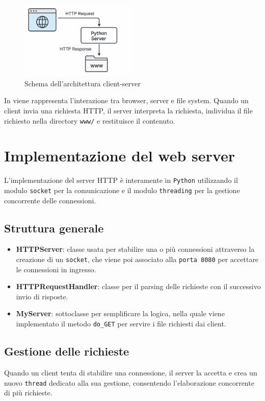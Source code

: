 \documentclass[a4paper,12pt]{report}
\begin{document}
\begin{figure}[H]
	\centering
	\includegraphics[width=0.5\textwidth]{img/architettura.png}
	\caption{Schema dell'architettura client-server}
	\label{fig:architettura}
\end{figure}

In  viene rappresenta l'interazione tra browser, server e file system. Quando un client
invia una richiesta HTTP, il server interpreta la richiesta, individua il file richiesto nella directory \texttt{www/}
e restituisce il contenuto.


\chapter{Implementazione del web server}
L'implementazione del server HTTP è interamente in \texttt{Python} utilizzando il modulo \texttt{socket} per
la comunicazione e il modulo \texttt{threading} per la gestione concorrente delle connessioni.

\section{Struttura generale}
\begin{itemize}
	\item \textbf{HTTPServer}: classe usata per stabilire una o più connessioni \newline attraverso la creazione di
	      un \texttt{socket}, che viene poi associato alla \texttt{porta 8080} per accettare le connessioni in ingresso.
	\item \textbf{HTTPRequestHandler}: classe per il parsing delle richieste con il successivo invio di risposte.
	\item \textbf{MyServer}: sottoclasse per semplificare la logica, nella quale viene implementato il
	      metodo \texttt{do\_GET} per servire i file richiesti dai client.
\end{itemize}


\section{Gestione delle richieste}
Quando un client tenta di stabilire una connessione, il server la accetta e crea un nuovo \texttt{thread} dedicato alla sua gestione,
consentendo l'elaborazione concorrente di più richieste.
\end{document}
